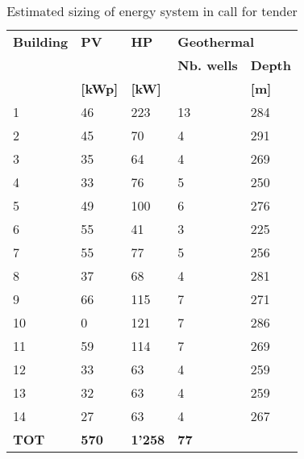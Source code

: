\begin{table}[h!]
\centering
\caption{Estimated sizing of energy system in call for tender}\vspace{2mm}
\label{tab:ppa_prestudy} 
\begin{tabular}{lllll}
\toprule
\textbf{Building} & \textbf{PV}    & \textbf{HP}    & \multicolumn{2}{l}{\textbf{Geothermal}} \\
         &       &       & \textbf{Nb. wells}        & \textbf{Depth}        \\
         & \textbf{[kWp]} & \textbf{[kW] } &                 & \textbf{[m] }         \\
         \midrule
1        & 46    & 223   & 13              & 284          \\
2        & 45    & 70    & 4               & 291          \\
3        & 35    & 64    & 4               & 269          \\
4        & 33    & 76    & 5               & 250          \\
5        & 49    & 100   & 6               & 276          \\
6        & 55    & 41    & 3               & 225          \\
7        & 55    & 77    & 5               & 256          \\
8        & 37    & 68    & 4               & 281          \\
9        & 66    & 115   & 7               & 271          \\
10       & 0     & 121   & 7               & 286          \\
11       & 59    & 114   & 7               & 269          \\
12       & 33    & 63    & 4               & 259          \\
13       & 32    & 63    & 4               & 259          \\
14       & 27    & 63    & 4               & 267          \\
\midrule
\textbf{TOT}      & \textbf{570}   & \textbf{1'258} & \textbf{77}              &             \\
\bottomrule
\end{tabular}
\end{table}